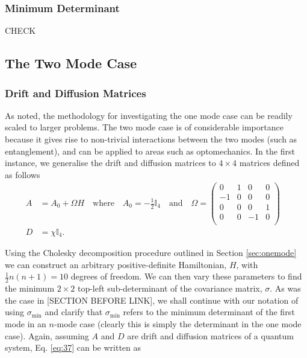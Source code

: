 \documentclass[11pt,a4paper]{article}
\numberwithin{equation}{section}
\begin{document}
	\subsubsection{Minimum Determinant}
	CHECK
	\fi 
	
	\subsection{The Two Mode Case}
	\subsubsection{Drift and Diffusion Matrices}
	As noted, the methodology for investigating the one mode case can be readily scaled to larger problems. The two mode case is of considerable importance because it gives rise to non-trivial interactions between the two modes (such as entanglement), and can be applied to areas such as optomechanics. In the first instance, we generalise the drift and diffusion matrices to $4 \times 4$ matrices defined as follows
	\begin{align*}
	A &= A_0 + \Omega H \quad\text{where}\quad A_0 = -\frac{1}{2}\mathbb{I}_4\quad\text{and}\quad \Omega = \begin{pmatrix}
	0 & 1 & 0 & 0 \\
	-1 & 0 & 0 & 0\\
	0 & 0 & 0 & 1\\
	0 & 0 & -1 & 0\\
	\end{pmatrix} &\\
	D &= \chi \mathbb{I}_4 .&
	\end{align*}
	
	Using the Cholesky decomposition procedure outlined in Section \ref{sec:onemode} we can construct an arbitrary positive-definite Hamiltonian, $H$, with $\frac{1}{2}n(n+1)=10$ degrees of freedom. We can then vary these parameters to find the minimum $2 \times 2$ top-left sub-determinant of the covariance matrix, $\sigma$. As was the case in [SECTION BEFORE LINK], we shall continue with our notation of using $\sigma_\text{min}$ and clarify that $\sigma_\text{min}$ refers to the minimum determinant of the first mode in an $n$-mode case (clearly this is simply the determinant in the one mode case). Again, assuming $A$ and $D$ are drift and diffusion matrices of a quantum system, Eq. \ref{eq:37} can be written as 
\end{document}
